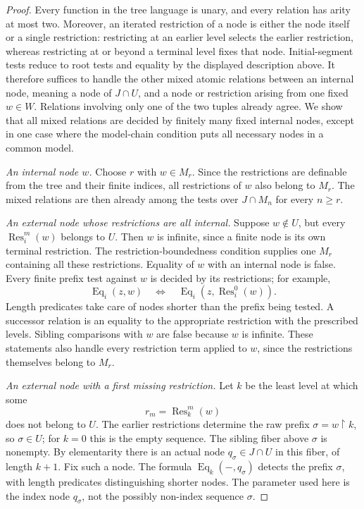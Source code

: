 \documentclass[11pt]{article}
\theoremstyle{definition}
\theoremstyle{remark}
\newcommand{\Res}{\operatorname{Res}}
\newcommand{\Eq}{\operatorname{Eq}}
\newcommand{\restr}{\mathbin{\upharpoonright}}
\begin{document}
\begin{proof}
Every function in the tree language is unary, and every relation has arity
at most two.  Moreover, an iterated restriction of a node is either the
node itself or a single restriction: restricting at an earlier level
selects the earlier restriction, whereas restricting at or beyond a
terminal level fixes that node.  Initial-segment tests reduce to root
tests and equality by the displayed description above. It therefore
suffices to handle the other mixed
atomic relations between an internal node, meaning a node of $J\cap U$,
and a node or restriction arising from one fixed $w\in W$.  Relations
involving only one of the two tuples already agree.  We show that all
mixed relations are decided by finitely many fixed internal nodes,
except in one case where the model-chain condition puts all necessary
nodes in a common model.

\medskip\noindent
\emph{An internal node $w$.}
Choose $r$ with $w\in M_r$.  Since the restrictions are definable from
the tree and their finite indices, all restrictions of $w$ also belong
to $M_r$.  The mixed relations are then already among the tests over
$J\cap M_n$ for every $n\geq r$.

\medskip\noindent
\emph{An external node whose restrictions are all internal.}
Suppose $w\notin U$, but every $\Res_i^m(w)$ belongs to $U$.
Then $w$ is infinite, since a finite node is its own terminal restriction.
The restriction-boundedness condition supplies one $M_r$ containing all
these restrictions.  Equality of $w$ with an internal node is false.
Every finite prefix test against $w$ is decided by its restrictions; for
example,
\[
 \Eq_i(z,w)\quad\Longleftrightarrow\quad
 \Eq_i(z,\Res_i^0(w)).
\]
Length predicates take care of nodes shorter than the prefix being tested.
A successor relation is an equality to the appropriate restriction with
the prescribed levels.  Sibling comparisons with $w$ are false because
$w$ is infinite.  These statements also handle
every restriction term applied to $w$, since the restrictions themselves
belong to $M_r$.

\medskip\noindent
\emph{An external node with a first missing restriction.}
Let $k$ be the least level at which some
\[
 r_m=\Res_k^m(w)
\]
does not belong to $U$.  The earlier restrictions determine the raw prefix
$\sigma=w\restr k$, so $\sigma\in U$; for $k=0$ this is the empty
sequence.  The sibling fiber above $\sigma$ is nonempty.  By elementarity
there is an actual node $q_\sigma\in J\cap U$ in this fiber, of length
$k+1$.  Fix such a node.  The formula $\Eq_k(-,q_\sigma)$ detects the
prefix $\sigma$, with length predicates distinguishing shorter nodes.
The parameter used here is the index node $q_\sigma$, not the possibly
non-index sequence $\sigma$.


\end{proof}
\end{document}
